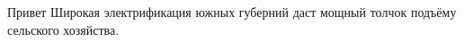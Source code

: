 \documentclass{article}
\begin{document}
Привет
Широкая электрификация южных губерний даст мощный толчок подъёму сельского хозяйства.
\end{document}
